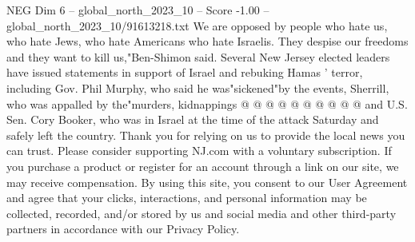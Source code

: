 \begin{textsample}{NEG Dim 6 – global\_north\_2023\_10 – Score -1.00 – global\_north\_2023\_10/91613218.txt}
We are opposed by people who hate us, who hate Jews, who hate Americans who hate Israelis.
They despise our freedoms and they want to kill us,"Ben-Shimon said.
Several New Jersey elected leaders have issued statements in support of Israel and rebuking Hamas ' terror, including Gov.
Phil Murphy, who said he was"sickened"by the events, Sherrill, who was appalled by the"murders, kidnappings @ @ @ @ @ @ @ @ @ @ and U.S.
Sen.
Cory Booker, who was in Israel at the time of the attack Saturday and safely left the country.
Thank you for relying on us to provide the local news you can trust.
Please consider supporting NJ.com with a voluntary subscription.
If you purchase a product or register for an account through a link on our site, we may receive compensation.
By using this site, you consent to our User Agreement and agree that your clicks, interactions, and personal information may be collected, recorded, and/or stored by us and social media and other third-party partners in accordance with our Privacy Policy.

\end{textsample}
